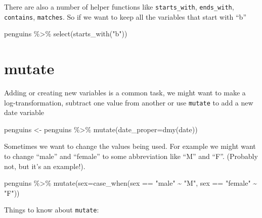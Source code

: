 \documentclass[
]{book}
\newenvironment{Shaded}{\begin{snugshade}}{\end{snugshade}}
\newcommand{\AttributeTok}[1]{\textcolor[rgb]{0.77,0.63,0.00}{#1}}
\newcommand{\FunctionTok}[1]{\textcolor[rgb]{0.00,0.00,0.00}{#1}}
\newcommand{\NormalTok}[1]{#1}
\newcommand{\OtherTok}[1]{\textcolor[rgb]{0.56,0.35,0.01}{#1}}
\newcommand{\SpecialCharTok}[1]{\textcolor[rgb]{0.00,0.00,0.00}{#1}}
\newcommand{\StringTok}[1]{\textcolor[rgb]{0.31,0.60,0.02}{#1}}
\begin{document}
There are also a number of helper functions like \texttt{starts\_with}, \texttt{ends\_with}, \texttt{contains}, \texttt{matches}. So if we want to keep all the variables that start with ``b''

\begin{Shaded}
\begin{Highlighting}[]
\NormalTok{penguins }\SpecialCharTok{\%\textgreater{}\%} 
  \FunctionTok{select}\NormalTok{(}\FunctionTok{starts\_with}\NormalTok{(}\StringTok{"b"}\NormalTok{))}
\end{Highlighting}
\end{Shaded}

\hypertarget{mutate}{%
\section{mutate}\label{mutate}}

Adding or creating new variables is a common task, we might want to make a log-transformation, subtract one value from another or use \texttt{mutate} to add a new date variable

\begin{Shaded}
\begin{Highlighting}[]
\NormalTok{penguins }\OtherTok{\textless{}{-}}\NormalTok{ penguins }\SpecialCharTok{\%\textgreater{}\%} 
  \FunctionTok{mutate}\NormalTok{(}\AttributeTok{date\_proper=}\FunctionTok{dmy}\NormalTok{(date))}
\end{Highlighting}
\end{Shaded}

Sometimes we want to change the values being used. For example we might want to change ``male'' and ``female'' to some abbreviation like ``M'' and ``F''. (Probably not, but it's an example!).

\begin{Shaded}
\begin{Highlighting}[]
\NormalTok{  penguins }\SpecialCharTok{\%\textgreater{}\%} 
  \FunctionTok{mutate}\NormalTok{(}\AttributeTok{sex=}\FunctionTok{case\_when}\NormalTok{(sex }\SpecialCharTok{==} \StringTok{"male"} \SpecialCharTok{\textasciitilde{}} \StringTok{"M"}\NormalTok{,}
\NormalTok{                       sex }\SpecialCharTok{==} \StringTok{"female"} \SpecialCharTok{\textasciitilde{}} \StringTok{"F"}\NormalTok{))}
\end{Highlighting}
\end{Shaded}

Things to know about \texttt{mutate}:
\end{document}
